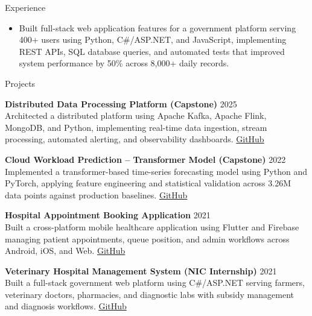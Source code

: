 \documentclass{resume}
\begin{document}
\begin{rSection}{Experience}
\begin{itemize}
\vspace{-2mm}
  \item Built full-stack web application features for a government platform serving 400+ users using Python, C\#/ASP.NET, and JavaScript, implementing REST APIs, SQL database queries, and automated tests that improved system performance by 50\% across 8,000+ daily records.
\end{itemize}

\end{rSection}

\vspace{-2mm}

\begin{rSection}{Projects}

\textbf{Distributed Data Processing Platform (Capstone)} \hfill 2025\\
Architected a distributed platform using Apache Kafka, Apache Flink, MongoDB, and Python, implementing real-time data ingestion, stream processing, automated alerting, and observability dashboards.
\href{https://github.com/steve-alex999/Data-Engineering-Optimizations-for-Secure-V2X-Communications.git}{GitHub}

\textbf{Cloud Workload Prediction -- Transformer Model (Capstone)} \hfill 2022\\
Implemented a transformer-based time-series forecasting model using Python and PyTorch, applying feature engineering and statistical validation across 3.26M data points against production baselines.
\href{https://github.com/steve-alex999/Cloud-Workload-Prediction.git}{GitHub}

\textbf{Hospital Appointment Booking Application} \hfill 2021\\
Built a cross-platform mobile healthcare application using Flutter and Firebase managing patient appointments, queue position, and admin workflows across Android, iOS, and Web.
\href{https://github.com/steve-alex999/Hospital-appointment-booking-app}{GitHub}

\textbf{Veterinary Hospital Management System (NIC Internship)} \hfill 2021\\
Built a full-stack government web platform using C\#/ASP.NET serving farmers, veterinary doctors, pharmacies, and diagnostic labs with subsidy management and diagnosis workflows.
\href{https://github.com/steve-alex999/Veterinary-Hospital-Management-System}{GitHub}

\end{rSection}
\end{document}
